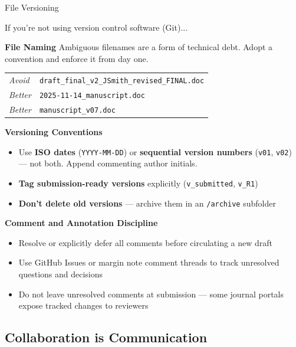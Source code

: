 \documentclass{beamer}
\begin{document}
\begin{frame}{File Versioning}

  \footnotesize

  If you're not using version control software (Git)...

  \medskip
  \textbf{File Naming}
  Ambiguous filenames are a form of technical debt.
  Adopt a convention and enforce it from day one.

  \smallskip
  \begin{center}
  {\scriptsize
  \begin{tabular}{@{}lp{8.5cm}@{}}
    \textit{Avoid}  & \texttt{draft\_final\_v2\_JSmith\_revised\_FINAL.doc} \\
    \textit{Better} & \texttt{2025-11-14\_manuscript.doc} \\
        \textit{Better} & \texttt{manuscript\_v07.doc} \\
  \end{tabular}
  }
  \end{center}

  \medskip
  \textbf{Versioning Conventions}
  \begin{itemize}
    \item Use \textbf{ISO dates} (\texttt{YYYY-MM-DD}) or
      \textbf{sequential version numbers} (\texttt{v01}, \texttt{v02})
      --- not both.  Append commenting author initials.
    \item \textbf{Tag submission-ready versions} explicitly
      (\texttt{v\_submitted}, \texttt{v\_R1})
    \item \textbf{Don't delete old versions} --- archive them in
      an \texttt{/archive} subfolder
  \end{itemize}

  \medskip
  \textbf{Comment and Annotation Discipline}
  \begin{itemize}
    \item Resolve or explicitly defer all comments before
      circulating a new draft
    \item Use GitHub Issues or margin note comment threads to track
      unresolved questions and decisions
    \item Do not leave unresolved comments at submission ---
      some journal portals expose tracked changes to reviewers
  \end{itemize}

\end{frame}


\subsection{Collaboration is Communication}
\end{document}
